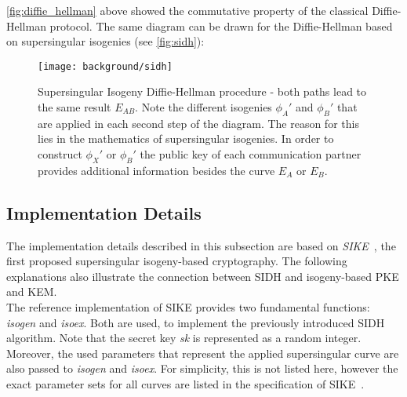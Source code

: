  \autoref{fig:diffie_hellman} above showed the commutative property of the classical Diffie-Hellman protocol. The same diagram can be drawn for the Diffie-Hellman based on supersingular isogenies (see \autoref{fig:sidh}):
\begin{figure}[H]
  \centering
  \texttt{[image: background/sidh]}
  \caption[Supersingular Isogeny Diffie-Hellman diagram]{Supersingular Isogeny Diffie-Hellman procedure - both paths lead to the same result $E_{AB}$. Note the different isogenies $\phi_{A}'$ and $\phi_{B}'$ that are applied in each second step of the diagram. The reason for this lies in the mathematics of supersingular isogenies. In order to construct $\phi_{X}'$ or $\phi_{B}'$ the public key of each communication partner provides additional information besides the curve $E_A$ or $E_B$.~\parencite{costello2016gentle}}
  \label{fig:sidh}
\end{figure}

\subsection{Implementation Details}\label{sec:sidh_implementation}

The implementation details described in this subsection are based on \textit{\gls{SIKE}}~\parencite{sike2020spec}, the first proposed supersingular isogeny-based cryptography. The following explanations also illustrate the connection between SIDH and isogeny-based \gls{PKE} and \gls{KEM}.\\
The reference implementation of \gls{SIKE} provides two fundamental functions: \textit{isogen} and \textit{isoex}. Both are used, to implement the previously introduced \gls{SIDH} algorithm. Note that the secret key \textit{sk} is represented as a random integer. Moreover, the used parameters that represent the applied supersingular curve are also passed to \textit{isogen} and \textit{isoex}. For simplicity, this is not listed here, however the exact parameter sets for all curves are listed in the specification of \gls{SIKE}~\parencite{sike2020spec}.

